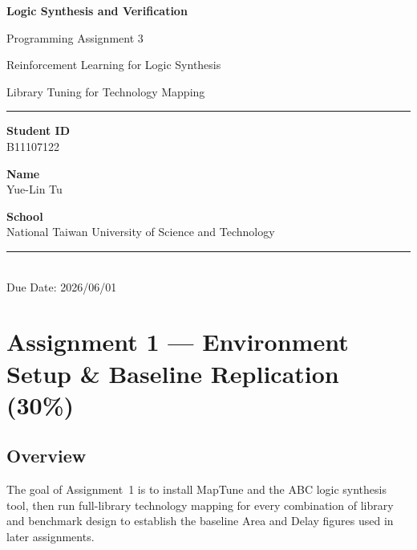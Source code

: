 \documentclass[12pt, a4paper]{report}
\title{}
\date{}
\begin{document}
\begin{titlepage}
\centering
\vspace*{3cm}
{\LARGE\bfseries Logic Synthesis and Verification\par}
\vspace{0.5em}
{\Large Programming Assignment 3\par}
\vspace{0.5em}
{\large Reinforcement Learning for Logic Synthesis\par}
\vspace{0.2em}
{\large Library Tuning for Technology Mapping\par}

\vspace{1cm}
\rule{0.6\linewidth}{0.8pt}

\vspace{2cm}
{\large\textbf{Student ID}\\[0.3em] B11107122\par}

\vspace{1em}
{\large\textbf{Name}\\[0.3em] Yue-Lin Tu\par}

\vspace{1em}
{\large\textbf{School}\\[0.3em] National Taiwan University of Science and Technology\par}

\vfill
\rule{0.6\linewidth}{0.8pt}\\[0.5em]
{\small Due Date: 2026/06/01}
\end{titlepage}

\tableofcontents
\clearpage

\chapter{Assignment 1 --- Environment Setup \& Baseline Replication (30\%)}

\section{Overview}

The goal of Assignment~1 is to install MapTune and the ABC logic synthesis tool,
then run full-library technology mapping for every combination of library and benchmark
design to establish the baseline Area and Delay figures used in later assignments.
\end{document}
